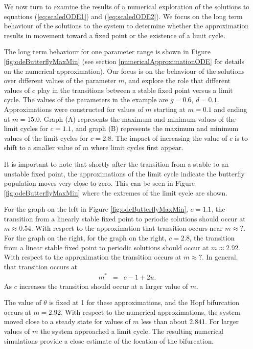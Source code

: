 \documentclass[review,authoryear]{elsarticle}
\begin{document}
We now turn to examine the results of a numerical exploration of the solutions to 
equations (\ref{eq:scaledODE1}) and (\ref{eq:scaledODE2}).
We focus on the long term behaviour of the solutions to the 
system to determine whether the approximation results in movement toward a fixed point or
the existence of a limit cycle.


The long term behaviour for one parameter range is shown in Figure
\ref{fig:odeButterflyMaxMin} (see section \ref{numericalApproximationODE} for details on the numerical approximation).  
Our focus is on the behaviour of the solutions over different values of the parameter $m$, and explore the role that 
different values of $c$ play in the transitions between a stable fixed point versus a limit cycle. 
The values of the parameters in the example are
$g=0.6$, $d=0.1$. Approximations were constructed for values
of $m$ starting at $m=0.1$ and ending at $m=15.0$.  Graph (A) represents the maximum and minimum values of the limit cycles for $c=1.1$, and graph (B) represents the maximum and minimum values of the limit cycles for $c=2.8$. The impact of increasing the value of $c$ is to shift to a smaller value of $m$ where limit cycles first appear.

It is important to note that shortly after the transition from a stable to an unstable fixed point, the approximations of the limit cycle indicate the butterfly population moves very close to zero. This can be seen in Figure \ref{fig:odeButterflyMaxMin} where the extremes of the limit cycle are shown.

For the graph on the left in Figure \ref{fig:odeButterflyMaxMin}, $c=1.1$, the transition from a linearly stable fixed point to periodic solutions should occur at $m\approx 0.54$. With respect to the approximation that transition occurs near $m\approx ?$. For the graph on the right, for the graph on the right, $c=2.8$, the transition from a linear stable fixed point to periodic solutions should occur at $m\approx 2.92$. With respect to the approximation the transition occurs at $m\approx ?$. In general, that transition occurs at
\begin{eqnarray}
m^* & = & c - 1 + 2 u.
\end{eqnarray}
As $c$ increases the transition should occur at a larger value of $m$.





The value of $\theta$ is fixed at 1 for these approximations, and the Hopf bifurcation occurs at $m=2.92$. With respect to the numerical approximations, the system moved close to a steady state for values of $m$ less than about 2.841. For larger values of $m$ the system approached a limit
cycle. The resulting numerical simulations provide a close estimate of the location of the bifurcation.
\end{document}
